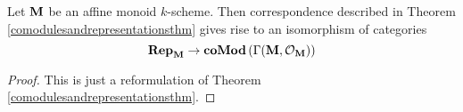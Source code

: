 \begin{corollary}\label{comodulesandrepresentation}
Let $\mathbf{M}$ be an affine monoid $k$-scheme. Then correspondence described in Theorem \ref{comodulesandrepresentationsthm} gives rise to an isomorphism of categories
$$\mathbf{Rep}_{\mathbf{M}}\rightarrow \mathbf{coMod}\left(\Gamma(\mathbf{M},{\mathcal O}_{\mathbf{M}})\right)$$
\end{corollary}
\begin{proof}
This is just a reformulation of Theorem \ref{comodulesandrepresentationsthm}.
\end{proof}



